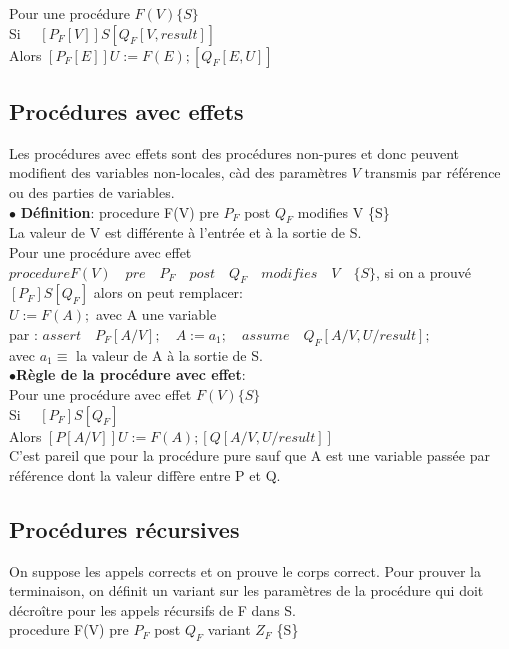 Pour une procédure $F(V) \{S\}$\\
Si $\quad  [P_F[V]]S[Q_F[V,result]]$\\
Alors $[P_F[E]]U:=F(E);[Q_F[E,U]]$\\
\subsection{Procédures avec effets}
Les procédures avec effets sont des procédures non-pures et donc peuvent modifient des variables non-locales, càd des paramètres $V$ transmis par référence ou des parties de variables.\\

$\bullet$ \textbf{Définition}: procedure F(V) pre $P_F$ post $Q_F$ modifies V \{S\}\\
La valeur de V est différente à l'entrée et à la sortie de S.\\

Pour une procédure avec effet $procedure F(V) \quad pre \quad P_F \quad post \quad Q_F \quad modifies \quad V \quad \{S\}$, si on a prouvé $[P_F] S [Q_F]$ alors on peut remplacer:\\
$U:=F(A);$ avec A une variable\\
par : $assert \quad P_F[A/V]; \quad A:= a_1; \quad assume \quad Q_F[A/V,U/result];$\\
avec $a_1 \equiv$ la valeur de A à la sortie de S.\\

$\bullet$\textbf{Règle de la procédure avec effet}:\\

Pour une procédure avec effet $F(V) \{S\}$\\
Si $\quad  [P_F]S[Q_F]$\\
Alors $[P[A/V]]U:=F(A);[Q[A/V,U/result]]$\\
C'est pareil que pour la procédure pure sauf que A est une variable passée par référence dont la valeur diffère entre P et Q. \vfill

\subsection{Procédures récursives}
On suppose les appels corrects et on prouve le corps correct.
Pour prouver la terminaison, on définit un variant sur les paramètres de la procédure qui doit décroître pour les appels récursifs de F dans S.\\
procedure F(V) pre $P_F$ post $Q_F$ variant $Z_F$ \{S\}\\

